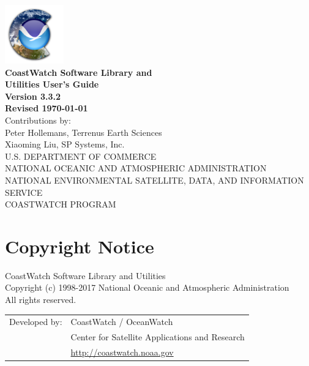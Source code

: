 \begin{titlepage}

  \begin{center}
    \includegraphics[height=1in]{icons/cdat.png} \\
    \vspace{0.5cm}
    {\Large \bf CoastWatch Software Library and \\ Utilities User's Guide} \\
    \vspace{1cm}
    {\large \bf Version 3.3.2 \\ Revised \today} \\
    \vspace{6cm} 
    {\small Contributions by: \\ Peter Hollemans, Terrenus Earth Sciences} \\
    {\small Xiaoming Liu, SP Systems, Inc.} \\
    \vspace{2cm}
    {\small U.S. DEPARTMENT OF COMMERCE \\
    NATIONAL OCEANIC AND ATMOSPHERIC ADMINISTRATION \\
    NATIONAL ENVIRONMENTAL SATELLITE, DATA, AND INFORMATION SERVICE \\
    COASTWATCH PROGRAM} \\
  \end{center}

\end{titlepage}


\section*{Copyright Notice}

CoastWatch Software Library and Utilities\\
Copyright (c) 1998-2017 National Oceanic and Atmospheric Administration\\
All rights reserved.

\noindent\begin{tabular}{@{}ll}
Developed by: & CoastWatch / OceanWatch \\
              & Center for Satellite Applications and Research \\
              & \url{http://coastwatch.noaa.gov}
\end{tabular}

